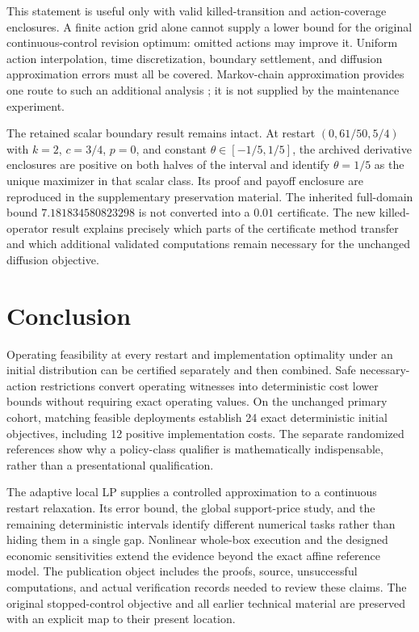 This statement is useful only with valid killed-transition and action-coverage enclosures. A finite action grid alone cannot supply a lower bound for the original continuous-control revision optimum: omitted actions may improve it. Uniform action interpolation, time discretization, boundary settlement, and diffusion approximation errors must all be covered. Markov-chain approximation provides one route to such an additional analysis \citep{KushnerDupuis2001}; it is not supplied by the maintenance experiment.

The retained scalar boundary result remains intact. At restart $(0,61/50,5/4)$ with $k=2$, $c=3/4$, $p=0$, and constant $\theta\in[-1/5,1/5]$, the archived derivative enclosures are positive on both halves of the interval and identify $\theta=1/5$ as the unique maximizer in that scalar class. Its proof and payoff enclosure are reproduced in the supplementary preservation material. The inherited full-domain bound $7.181834580823298$ is not converted into a $0.01$ certificate. The new killed-operator result explains precisely which parts of the certificate method transfer and which additional validated computations remain necessary for the unchanged diffusion objective.

\section{Conclusion}
Operating feasibility at every restart and implementation optimality under an initial distribution can be certified separately and then combined. Safe necessary-action restrictions convert operating witnesses into deterministic cost lower bounds without requiring exact operating values. On the unchanged primary cohort, matching feasible deployments establish 24 exact deterministic initial objectives, including 12 positive implementation costs. The separate randomized references show why a policy-class qualifier is mathematically indispensable, rather than a presentational qualification.

The adaptive local LP supplies a controlled approximation to a continuous restart relaxation. Its error bound, the global support-price study, and the remaining deterministic intervals identify different numerical tasks rather than hiding them in a single gap. Nonlinear whole-box execution and the designed economic sensitivities extend the evidence beyond the exact affine reference model. The publication object includes the proofs, source, unsuccessful computations, and actual verification records needed to review these claims. The original stopped-control objective and all earlier technical material are preserved with an explicit map to their present location.



